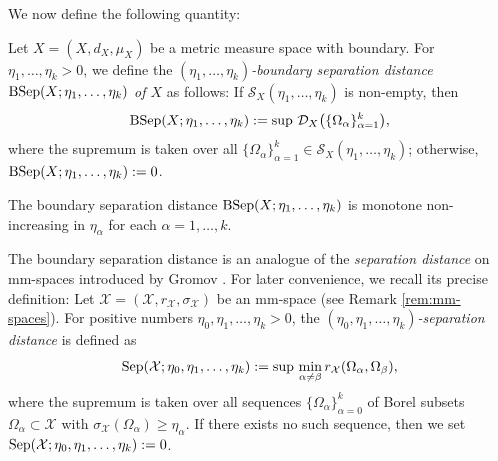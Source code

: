 We now define the following quantity:
\begin{defi}\label{defi:Dirichlet separation distance}
Let $X=(X,d_{X},\mu_{X})$ be a metric measure space with boundary.
For $\eta_{1},\dots,\eta_{k}>0$,
we define the \textit{$(\eta_{1},\dots,\eta_{k})$-boundary separation distance $\operatorname{BSep}(X;\eta_{1},\dots,\eta_{k})$ of $X$} as follows:
If $\mathcal{S}_{X}(\eta_{1},\dots,\eta_{k})$ is non-empty,
then 
\begin{equation*}
\operatorname{BSep}(X;\eta_{1},\dots,\eta_{k}):=\sup\,\mathcal{D}_{X}\bigl(\{\Omega_{\alpha}\}^{k}_{\alpha=1}\bigl),
\end{equation*}
where the supremum is taken over all $\{\Omega_{\alpha}\}^{k}_{\alpha=1} \in \mathcal{S}_{X}(\eta_{1},\dots,\eta_{k})$;
otherwise,
$\operatorname{BSep}(X;\eta_{1},\dots,\eta_{k}):=0$.
\end{defi}
The boundary separation distance $\operatorname{BSep}(X;\eta_{1},\dots,\eta_{k})$ is monotone non-increasing in $\eta_{\alpha}$ for each $\alpha=1,\dots,k$.

\begin{rem}\label{rem:Gromov separation distance}
The boundary separation distance is an analogue of the \textit{separation distance} on mm-spaces introduced by Gromov \cite{G}.
For later convenience,
we recall its precise definition:
Let $\mathcal{X}=(\mathcal{X},r_{\mathcal{X}},\sigma_{\mathcal{X}})$ be an mm-space (see Remark \ref{rem:mm-spaces}).
For positive numbers $\eta_{0}, \eta_{1},\dots,\eta_{k}>0$,
the \textit{$(\eta_{0}, \eta_{1},\dots,\eta_{k})$-separation distance} is defined as
\begin{equation}\label{eq:Gromov separation distance}
\operatorname{Sep}(\mathcal{X};\eta_{0}, \eta_{1},\dots,\eta_{k}):=\sup\, \min_{\alpha \neq \beta} r_{\mathcal{X}}(\Omega_{\alpha},\Omega_{\beta}),
\end{equation}
where the supremum is taken over all sequences $\{\Omega_{\alpha}\}^{k}_{\alpha=0}$ of Borel subsets $\Omega_{\alpha} \subset \mathcal{X}$ with $\sigma_{\mathcal{X}}(\Omega_{\alpha})\geq \eta_{\alpha}$.
If there exists no such sequence,
then we set $\operatorname{Sep}(\mathcal{X};\eta_{0}, \eta_{1},\dots,\eta_{k}):=0$.
\end{rem}

